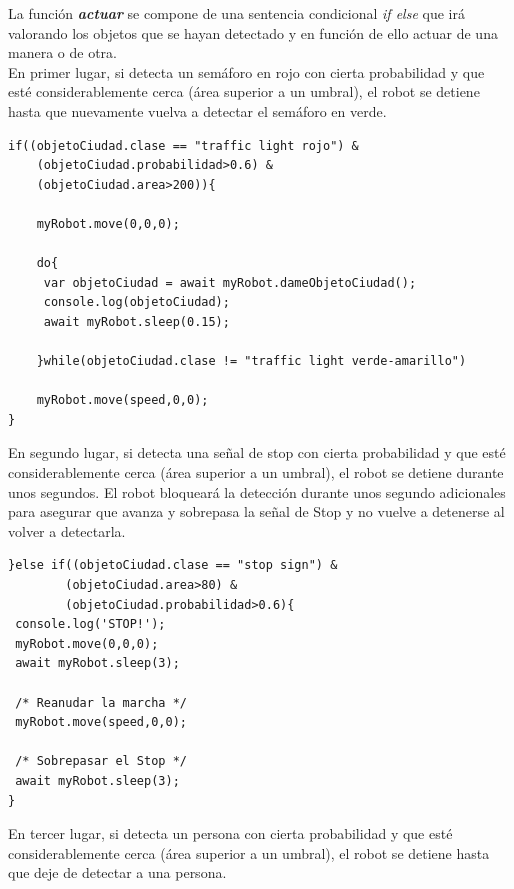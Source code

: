 \documentclass{report}
\begin{document}
La función \textit{\textbf{actuar}} se compone de una sentencia condicional \textit{if else} que irá valorando los objetos que se hayan detectado y en función de ello actuar de una manera o de otra.
\\

En primer lugar, si detecta un semáforo en rojo con cierta probabilidad y que esté considerablemente cerca (área superior a un umbral), el robot se detiene hasta que nuevamente vuelva a detectar el semáforo en verde.

\begin{lstlisting}[backgroundcolor = \color{light-gray},
				   aboveskip = 2em,
				   belowskip = 2em,
                   xleftmargin = 2cm,
                   framexleftmargin = 1em,
                   basicstyle=\small]
if((objetoCiudad.clase == "traffic light rojo") &
	(objetoCiudad.probabilidad>0.6) &
	(objetoCiudad.area>200)){
	
	myRobot.move(0,0,0);

	do{
	 var objetoCiudad = await myRobot.dameObjetoCiudad();
	 console.log(objetoCiudad);
	 await myRobot.sleep(0.15);

	}while(objetoCiudad.clase != "traffic light verde-amarillo")

	myRobot.move(speed,0,0);
}
\end{lstlisting}

En segundo lugar, si detecta una señal de stop con cierta probabilidad y que esté considerablemente cerca (área superior a un umbral), el robot se detiene durante unos segundos. El robot bloqueará la detección durante unos segundo adicionales para asegurar que avanza y sobrepasa la señal de Stop y no vuelve a detenerse al volver a detectarla.

\newpage
\begin{lstlisting}[backgroundcolor = \color{light-gray},
				   aboveskip = 2em,
				   belowskip = 2em,
                   xleftmargin = 2cm,
                   framexleftmargin = 1em,
                   basicstyle=\small]
}else if((objetoCiudad.clase == "stop sign") &
        (objetoCiudad.area>80) & 
        (objetoCiudad.probabilidad>0.6){
 console.log('STOP!');
 myRobot.move(0,0,0);
 await myRobot.sleep(3);
 
 /* Reanudar la marcha */
 myRobot.move(speed,0,0);
 
 /* Sobrepasar el Stop */
 await myRobot.sleep(3);
}
\end{lstlisting}

En tercer lugar, si detecta un persona con cierta probabilidad y que esté considerablemente cerca (área superior a un umbral), el robot se detiene hasta que deje de detectar a una persona.
\end{document}
